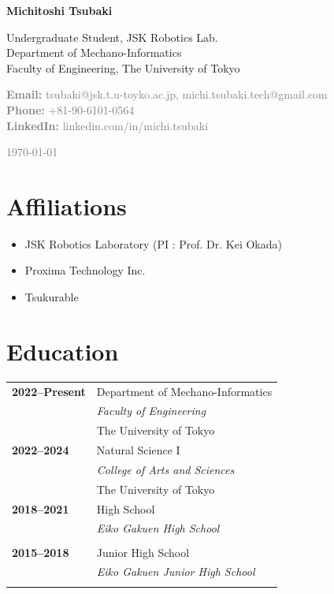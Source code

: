 \documentclass[11pt,a4paper]{article}
\newcommand{\cventry}[4]{\textbf{#1} & #2 \\ & \textit{#3} \\ & #4 \\[0.5em]}
\begin{document}
\begin{minipage}[t]{0.7\textwidth}
    \vspace{0pt}
    {\Huge\bfseries\color{darkblue} Michitoshi Tsubaki}
    \vspace{0.3cm}
    
    {\Large Undergraduate Student, JSK Robotics Lab.}\\
    Department of Mechano-Informatics\\
    Faculty of Engineering, The University of Tokyo
    \vspace{0.5cm}
    
    \textcolor{gray}{
    \textbf{Email:} tsubaki@jsk.t.u-toyko.ac.jp, michi.tsubaki.tech@gmail.com\\
    \textbf{Phone:} +81-90-6101-0564\\
    \textbf{LinkedIn:} linkedin.com/in/michi.tsubaki
    }
\end{minipage}
\hfill
\begin{minipage}[t]{0.25\textwidth}
    \vspace{0pt}
    \raggedleft
    \textcolor{gray}{\small \today}\\[0.3cm]
\end{minipage}

\vspace{1cm}

\section{Affiliations}
\begin{itemize}[leftmargin=1cm,itemsep=0.2em]
    \item JSK Robotics Laboratory (PI : Prof. Dr. Kei Okada)
    \item Proxima Technology Inc.
    \item Tsukurable
\end{itemize}

\section{Education}
\begin{tabularx}{\textwidth}{@{}p{2.5cm}X@{}}
\cventry{2022--Present}{Department of Mechano-Informatics}{Faculty of Engineering}{The University of Tokyo}
\cventry{2022--2024}{Natural Science I}{College of Arts and Sciences}{The University of Tokyo}
\cventry{2018--2021}{High School}{Eiko Gakuen High School}{}
\cventry{2015--2018}{Junior High School}{Eiko Gakuen Junior High School}{}
\end{tabularx}
\end{document}
